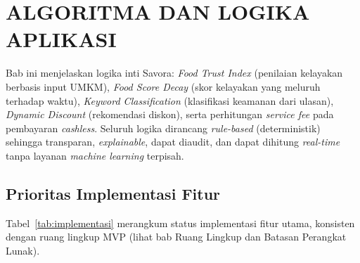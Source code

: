 \section{ALGORITMA DAN LOGIKA APLIKASI}

Bab ini menjelaskan logika inti Savora: \textit{Food Trust Index} (penilaian kelayakan berbasis
input UMKM), \textit{Food Score Decay} (skor kelayakan yang meluruh terhadap waktu), \textit{Keyword
Classification} (klasifikasi keamanan dari ulasan), \textit{Dynamic Discount} (rekomendasi diskon),
serta perhitungan \textit{service fee} pada pembayaran \textit{cashless}. Seluruh logika dirancang
\textit{rule-based} (deterministik) sehingga transparan, \textit{explainable}, dapat diaudit, dan
dapat dihitung \textit{real-time} tanpa layanan \textit{machine learning} terpisah.

\subsection{Prioritas Implementasi Fitur}

Tabel~\ref{tab:implementasi} merangkum status implementasi fitur utama, konsisten dengan ruang
lingkup MVP (lihat bab Ruang Lingkup dan Batasan Perangkat Lunak).

